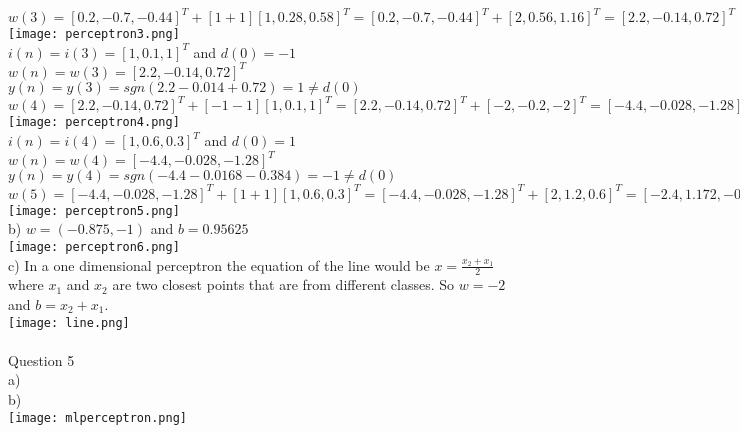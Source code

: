 \documentclass{article}
\begin{document}
\\ $ w(3) = [0.2,-0.7,-0.44]^{T} +[1+1][1, 0.28, 0.58]^{T}= [0.2,-0.7,-0.44]^{T} +[2, 0.56, 1.16]^{T}= [2.2,-0.14,0.72]^{T}$
\\  \texttt{[image: perceptron3.png]}
\\ $i(n) = i(3) = [1, 0.1, 1]^{T}$ and $ d(0) = -1$
\\ $w(n) = w(3)=[2.2,-0.14,0.72]^{T}$
\\ $y(n) = y(3) = sgn(2.2-0.014+0.72) = 1 \neq d(0)$
\\ $ w(4) = [2.2,-0.14,0.72]^{T} +[-1-1][1, 0.1, 1]^{T}= [2.2,-0.14,0.72]^{T} +[-2, -0.2, -2]^{T}= [-4.4,-0.028,-1.28]^{T}$
\\  \texttt{[image: perceptron4.png]}
\\ $i(n) = i(4) = [1, 0.6, 0.3]^{T}$ and $ d(0) = 1$
\\ $w(n) = w(4)=[-4.4,-0.028,-1.28]^{T}$
\\ $y(n) = y(4) = sgn(-4.4-0.0168-0.384) = -1 \neq d(0)$
\\ $ w(5) = [-4.4,-0.028,-1.28]^{T} +[1+1][1, 0.6, 0.3]^{T}= [-4.4,-0.028,-1.28]^{T} +[2, 1.2, 0.6]^{T}= [-2.4,1.172,-0.68]^{T}$
\\  \texttt{[image: perceptron5.png]}
\\
b) $w = (-0.875, -1)$ and $b = 0.95625$
\\ \texttt{[image: perceptron6.png]}
\\
c) In a one dimensional perceptron the equation of the line would be $ x= \frac{x_{2}+x_{1}}{2}$ where $x_{1}$ and $x_{2}$ are two closest points that are from different classes. So $w = -2$ and $b = x_{2}+x_{1}$. 
\\  \texttt{[image: line.png]}
\\
\\
Question 5
\\
a)
\\ 
b)\\ \texttt{[image: mlperceptron.png]}
\end{document}
